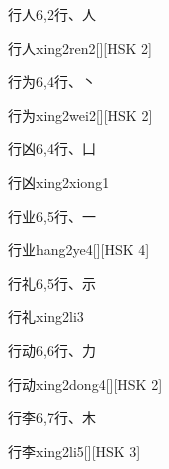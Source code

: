\begin{entry}{行人}{6,2}{⾏、⼈}
  \begin{phonetics}{行人}{xing2ren2}[][HSK 2]
  \end{phonetics}
\end{entry}

\begin{entry}{行为}{6,4}{⾏、⼂}
  \begin{phonetics}{行为}{xing2wei2}[][HSK 2]
  \end{phonetics}
\end{entry}

\begin{entry}{行凶}{6,4}{⾏、⼐}
  \begin{phonetics}{行凶}{xing2xiong1}
  \end{phonetics}
\end{entry}

\begin{entry}{行业}{6,5}{⾏、⼀}
  \begin{phonetics}{行业}{hang2ye4}[][HSK 4]
  \end{phonetics}
\end{entry}

\begin{entry}{行礼}{6,5}{⾏、⽰}
  \begin{phonetics}{行礼}{xing2li3}
  \end{phonetics}
\end{entry}

\begin{entry}{行动}{6,6}{⾏、⼒}
  \begin{phonetics}{行动}{xing2dong4}[][HSK 2]
  \end{phonetics}
\end{entry}

\begin{entry}{行李}{6,7}{⾏、⽊}
  \begin{phonetics}{行李}{xing2li5}[][HSK 3]
  \end{phonetics}
\end{entry}

